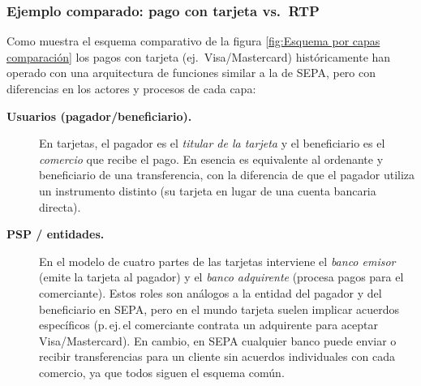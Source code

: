 \subsubsection*{Ejemplo comparado: pago con tarjeta vs.\ RTP}

Como muestra el esquema comparativo de la figura \ref{fig:Esquema por capas comparación} los pagos con tarjeta (ej.\ Visa/Mastercard) históricamente han operado con una arquitectura de funciones similar a la de SEPA, pero con diferencias en los actores y procesos de cada capa:

\begin{description}
  \item[\textbf{Usuarios (pagador/beneficiario).}]
    En tarjetas, el pagador es el \emph{titular de la tarjeta} y el beneficiario es el \emph{comercio} que recibe el pago. En esencia es equivalente al ordenante y beneficiario de una transferencia, con la diferencia de que el pagador utiliza un instrumento distinto (su tarjeta en lugar de una cuenta bancaria directa).

  \item[\textbf{PSP / entidades.}]
    En el modelo de cuatro partes de las tarjetas interviene el \emph{banco emisor} (emite la tarjeta al pagador) y el \emph{banco adquirente} (procesa pagos para el comerciante). Estos roles son análogos a la entidad del pagador y del beneficiario en SEPA, pero en el mundo tarjeta suelen implicar acuerdos específicos (p.\,ej.\,el comerciante contrata un adquirente para aceptar Visa/Mastercard). En cambio, en SEPA cualquier banco puede enviar o recibir transferencias para un cliente sin acuerdos individuales con cada comercio, ya que todos siguen el esquema común.


\end{description}
